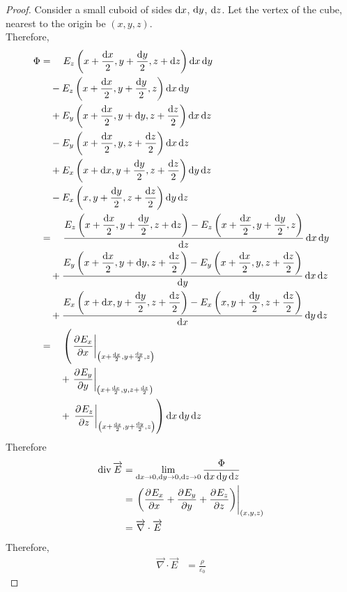 \documentclass[fleqn, a4paper, 12pt, twoside]{article}
\theoremstyle{definition}
\theoremstyle{theorem}
\newcommand{\divergence}{\mathrm{div\,}}
\begin{document}
\begin{proof}
	Consider a small cuboid of sides $\dif x$, $\dif y$, $\dif z$.
	Let the vertex of the cube, nearest to the origin be $(x,y,z)$.\\
	Therefore,
	\begin{align*}
		\Phi &= \quad E_z \left( x + \dfrac{\dif x}{2}, y + \dfrac{\dif y}{2}, z + \dif z \right) \dif x \dif y\\
		&\quad - E_z \left( x + \dfrac{\dif x}{2}, y + \dfrac{\dif y}{2}, z \right) \dif x \dif y\\
		&\quad + E_y \left( x + \dfrac{\dif x}{2}, y + \dif y, z + \dfrac{\dif z}{2} \right) \dif x \dif z\\
		&\quad  - E_y \left( x + \dfrac{\dif x}{2}, y, z + \dfrac{\dif z}{2} \right) \dif x \dif z\\
		&\quad + E_x \left( x + \dif x, y + \dfrac{\dif y}{2}, z + \dfrac{\dif z}{2} \right) \dif y \dif z\\
		&\quad  - E_x \left( x, y + \dfrac{\dif y}{2}, z + \dfrac{\dif z}{2} \right) \dif y \dif z\\
		&= \quad \dfrac{E_z \left( x + \dfrac{\dif x}{2}, y + \dfrac{\dif y}{2}, z + \dif z \right) - E_z \left( x + \dfrac{\dif x}{2}, y + \dfrac{\dif y}{2}, z \right)}{\dif z} \dif x \dif y\\
		&\quad + \dfrac{E_y \left( x + \dfrac{\dif x}{2}, y + \dif y, z + \dfrac{\dif z}{2} \right) - E_y \left( x + \dfrac{\dif x}{2}, y, z + \dfrac{\dif z}{2} \right)}{\dif y} \dif x \dif z\\
		&\quad + \dfrac{E_x \left( x + \dif x, y + \dfrac{\dif y}{2}, z + \dfrac{\dif z}{2} \right) - E_x \left( x, y + \dfrac{\dif y}{2}, z + \dfrac{\dif z}{2} \right)}{\dif x} \dif y \dif z\\
		&= \quad \left( \left. \dpd{E_x}{x} \right|_{\left( x + \frac{\dif x}{2}, y + \frac{\dif y}{2}, z \right)} \right.\\
		&\quad \quad + \left. \dpd{E_y}{y} \right|_{\left( x + \frac{\dif x}{2}, y, z + \frac{\dif z}{2} \right)}\\
		&\quad \quad + \left. \left. \dpd{E_z}{z} \right|_{\left( x + \frac{\dif x}{2}, y + \frac{\dif y}{2}, z \right)} \right) \dif x \dif y \dif z\\
	\end{align*}
	Therefore
	\begin{align*}
		\divergence \overrightarrow{E} &= \lim\limits_{\dif x \to 0, \dif y \to 0, \dif z \to 0} \dfrac{\Phi}{\dif x \dif y \dif z}\\
		&= \left. \left( \dpd{E_x}{x} + \dpd{E_y}{y} + \dpd{E_z}{z} \right) \right|_{(x,y,z)}\\
		&= \overrightarrow{\nabla} \cdot \overrightarrow{E}
	\end{align*}
	Therefore,
	\begin{align*}
		\overrightarrow{\nabla} \cdot \overrightarrow{E} &= \frac{\rho}{\varepsilon_0}
	\end{align*}
\end{proof}
\end{document}
